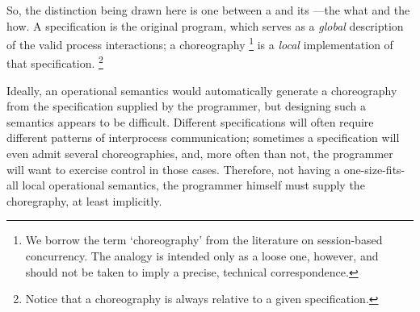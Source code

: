 \documentclass[
  class=../hdeyoung-proposal,
  crop=false
]{standalone}
\begin{document}
So, the distinction being drawn here is one between a  and its ---the what and the how.
A specification is the original program, which serves as a \emph{global} description of the valid process interactions; a choreography%
\footnote{We borrow the term \enquote*{choreography} from the literature on session-based concurrency.
The analogy is intended only as a loose one, however, and should not be taken to imply a precise, technical correspondence.}
is a \emph{local} implementation of that specification.%
\footnote{Notice that a choreography is always relative to a given specification.}

Ideally, an operational semantics would automatically generate a choreography from the specification supplied by the programmer, but designing such a semantics appears to be difficult.
Different specifications will often require different patterns of interprocess communication;
sometimes a specification will even admit several choreographies, and, more often than not, the programmer will want to exercise control in those cases.
Therefore, not having a one-size-fits-all local operational semantics, the programmer himself must supply the choregraphy, at least implicitly.
\end{document}
